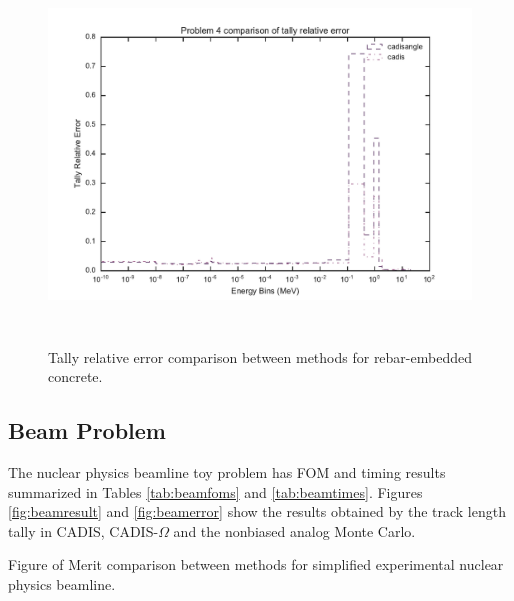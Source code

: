 \begin{figure}[h!]
  \centering
  \includegraphics[height=10cm]{./chapters/characterization_probs/figures/char/prob_4/problem_4_tally_error_compare.pdf}
  \caption[Tally relative error comparison between methods for rebar-embedded concrete.]
  {Tally relative error comparison between methods for rebar-embedded concrete.}
  \label{fig:rebarerror}
\end{figure}
%
%
%

\subsection{Beam Problem}
\label{subsec:resultsbeam}

The nuclear physics beamline toy problem has FOM and timing
results summarized in Tables
\ref{tab:beamfoms} and \ref{tab:beamtimes}. Figures
\ref{fig:beamresult} and \ref{fig:beamerror} show the results obtained
by the track length tally in CADIS, CADIS-$\Omega$ and the nonbiased analog
Monte Carlo.

\begin{table}[h!]
  \centering
  
  \caption[Figure of Merit comparison between methods for simplified
    experimental nuclear physics beamline.]
    {Figure of Merit comparison between methods for simplified experimental
    nuclear physics beamline.}
  \label{tab:beamfoms}
\end{table}

